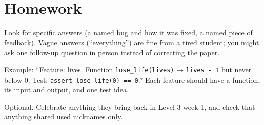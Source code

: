 \section{Homework}
\begin{answer}
Look for specific answers (a named bug and how it was fixed, a named piece of feedback). Vague
answers (\enquote{everything}) are fine from a tired student; you might ask one follow-up question
in person instead of correcting the paper.
\end{answer}

\begin{answer}
Example: \enquote{Feature: lives. Function \texttt{lose\_life(lives)} → \texttt{lives - 1} but never below
0. Test: \texttt{assert lose\_life(0) == 0}.} Each feature should have a function, its input and
output, and one test idea.
\end{answer}

\begin{answer}
Optional. Celebrate anything they bring back in Level 3 week 1, and check that anything shared used
nicknames only.
\end{answer}
